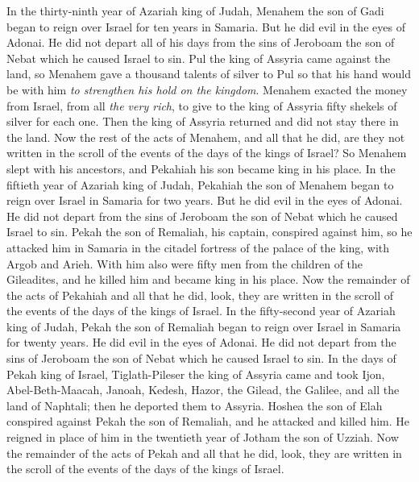 \begin{biblechapter}
 In the thirty-ninth year of Azariah king of Judah, Menahem the son of Gadi began to reign over Israel for ten years in Samaria.
\verse But he did evil in the eyes of Adonai. He did not depart all of his days from the sins of Jeroboam the son of Nebat which he caused Israel to sin.
\verse Pul the king of Assyria came against the land, so Menahem gave a thousand talents of silver to Pul so that his hand would be with him \textit{to strengthen his hold on the kingdom}.
\verse Menahem exacted the money from Israel, from all \textit{the very rich}, to give to the king of Assyria fifty shekels of silver for each one. Then the king of Assyria returned and did not stay there in the land.
\verse Now the rest of the acts of Menahem, and all that he did, are they not written in the scroll of the events of the days of the kings of Israel?
\verse So Menahem slept with his ancestors, and Pekahiah his son became king in his place.
 In the fiftieth year of Azariah king of Judah, Pekahiah the son of Menahem began to reign over Israel in Samaria for two years.
\verse But he did evil in the eyes of Adonai. He did not depart from the sins of Jeroboam the son of Nebat which he caused Israel to sin.
\verse Pekah the son of Remaliah, his captain, conspired against him, so he attacked him in Samaria in the citadel fortress of the palace of the king, with Argob and Arieh. With him also were fifty men from the children of the Gileadites, and he killed him and became king in his place.
\verse Now the remainder of the acts of Pekahiah and all that he did, look, they are written in the scroll of the events of the days of the kings of Israel.
 In the fifty-second year of Azariah king of Judah, Pekah the son of Remaliah began to reign over Israel in Samaria for twenty years.
\verse He did evil in the eyes of Adonai. He did not depart from the sins of Jeroboam the son of Nebat which he caused Israel to sin.
\verse In the days of Pekah king of Israel, Tiglath-Pileser the king of Assyria came and took Ijon, Abel-Beth-Maacah, Janoah, Kedesh, Hazor, the Gilead, the Galilee, and all the land of Naphtali; then he deported them to Assyria.
\verse Hoshea the son of Elah conspired against Pekah the son of Remaliah, and he attacked and killed him. He reigned in place of him in the twentieth year of Jotham the son of Uzziah.
\verse Now the remainder of the acts of Pekah and all that he did, look, they are written in the scroll of the events of the days of the kings of Israel.

\end{biblechapter}
